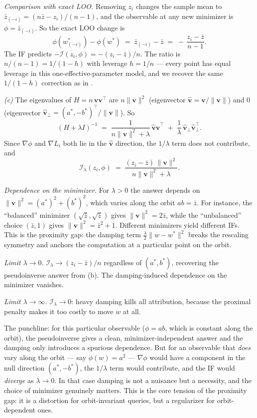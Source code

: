 \documentclass[11pt]{article}
\begin{document}
\begin{solution}[ex:if-degenerate]
\emph{Comparison with exact LOO.} Removing $z_i$ changes the sample mean to $\bar z_{(-i)} = (n\bar z - z_i)/(n-1)$, and the observable at any new minimizer is $\phi = \bar z_{(-i)}$. So the exact LOO change is
\[
  \phi(w^*_{(-i)}) - \phi(w^*) \;=\; \bar z_{(-i)} - \bar z \;=\; -\,\frac{z_i - \bar z}{n-1}.
\]
The IF predicts $-\mathcal{I}(z_i,\phi) = -(z_i-\bar z)/n$. The ratio is $n/(n-1) = 1/(1-h)$ with leverage $h = 1/n$ --- every point has equal leverage in this one-effective-parameter model, and we recover the same $1/(1-h)$ correction as in .

\textit{(c)} The eigenvalues of $H = n\,\mathbf{v}\mathbf{v}^\top$ are $n\|\mathbf{v}\|^2$ (eigenvector $\hat{\mathbf{v}} = \mathbf{v}/\|\mathbf{v}\|$) and $0$ (eigenvector $\hat{\mathbf{v}}_\perp = (a^*,-b^*)^\top/\|\mathbf{v}\|$). So
\[
  (H+\lambda I)^{-1}
  \;=\; \frac{1}{n\|\mathbf{v}\|^2+\lambda}\,\hat{\mathbf{v}}\hat{\mathbf{v}}^\top
  \;+\; \frac{1}{\lambda}\,\hat{\mathbf{v}}_\perp\hat{\mathbf{v}}_\perp^\top.
\]
Since $\nabla\phi$ and $\nabla L_i$ both lie in the $\hat{\mathbf{v}}$ direction, the $1/\lambda$ term does not contribute, and
\[
  \mathcal{I}_\lambda(z_i,\phi) \;=\; \frac{(z_i-\bar z)\,\|\mathbf{v}\|^2}{n\|\mathbf{v}\|^2 + \lambda}.
\]

\emph{Dependence on the minimizer.} For $\lambda > 0$ the answer depends on $\|\mathbf{v}\|^2 = (a^*)^2 + (b^*)^2$, which varies along the orbit $ab = \bar z$. For instance, the ``balanced'' minimizer $(\sqrt{\bar z},\sqrt{\bar z})$ gives $\|\mathbf{v}\|^2 = 2\bar z$, while the ``unbalanced'' choice $(\bar z,1)$ gives $\|\mathbf{v}\|^2 = \bar z^2 + 1$. Different minimizers yield different IFs. This is the proximity gap: the damping term $\tfrac\lambda2\|w-w^*\|^2$ breaks the rescaling symmetry and anchors the computation at a particular point on the orbit.

\emph{Limit $\lambda\to 0$.} $\mathcal{I}_\lambda \to (z_i-\bar z)/n$ regardless of $(a^*,b^*)$, recovering the pseudoinverse answer from (b). The damping-induced dependence on the minimizer vanishes.

\emph{Limit $\lambda\to\infty$.} $\mathcal{I}_\lambda \to 0$: heavy damping kills all attribution, because the proximal penalty makes it too costly to move $w$ at all.

The punchline: for this particular observable ($\phi = ab$, which is constant along the orbit), the pseudoinverse gives a clean, minimizer-independent answer and the damping only introduces a spurious dependence. But for an observable that \emph{does} vary along the orbit --- say $\phi(w) = a^2$ --- $\nabla\phi$ would have a component in the null direction $(a^*,-b^*)$, the $1/\lambda$ term would contribute, and the IF would \emph{diverge} as $\lambda\to 0$. In that case damping is not a nuisance but a necessity, and the choice of minimizer genuinely matters. This is the core tension of the proximity gap: it is a distortion for orbit-invariant queries, but a regularizer for orbit-dependent ones.

\end{solution}
\end{document}
